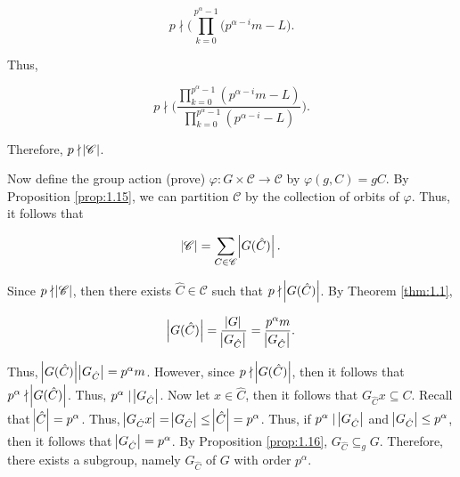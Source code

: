 \documentclass{article}
\makeatletter
\theoremstyle{definition}
\theoremstyle{remark}
\let\oldproofname=\proofname
\renewcommand{\proofname}{\bf{\textit{\oldproofname}}}
\theoremstyle{definition}
\renewenvironment{proof}[1][\proofname]{\par
  \pushQED{\qed}%
  \normalfont \topsep6\p@\@plus6\p@\relax
  \list{}{\leftmargin=0mm
          \rightmargin=0mm
          \settowidth{\itemindent}{\itshape#1}%
          \labelwidth=4mm
          \parsep=0pt \listparindent=0mm%
  }
  \item[\hskip\labelsep
        \itshape
    #1\@addpunct{.}]\ignorespaces
}{%
  \popQED\endlist\@endpefalse
}
\makeatother
\begin{document}
\begin{proof}
            \begin{equation*}
                p\nmid\bigg(\prod\limits_{k=0}^{p^{\alpha}-1}(p^{\alpha-i}m-L\bigg).
            \end{equation*}
                
            Thus, 
                
            \begin{equation*}
                p\nmid\bigg(\frac{\prod\limits_{k=0}^{p^{\alpha}-1}(p^{\alpha-i}m-L)}{\prod\limits_{k=0}^{p^{\alpha}-1}(p^{\alpha-i}-L)}\bigg).
            \end{equation*}
                
            Therefore, $p\nmid\abs{\mathscr{C}}$.\par\hspace{4mm} Now define the group action (prove) $\varphi\colon G\times\mathscr{C}\rightarrow\mathscr{C}$ by $\varphi(g,C)=gC$. By Proposition \ref{prop:1.15}, we can partition $\mathscr{C}$ by the collection of orbits of $\varphi$. Thus, it follows that
                
            \begin{equation*}
                \abs{\mathscr{C}}=\sum_{C\in\mathscr{C}}\abs{G(\hat{C})}.
            \end{equation*}
                
            Since $p\nmid\abs{\mathscr{C}}$, then there exists $\hat{C}\in\mathscr{C}$ such that $p\nmid\abs{G(\hat{C})}$. By Theorem \ref{thm:1.1}, 
            
            \begin{equation*}
                \abs{G(\hat{C})}=\frac{\abs{G}}{\abs{G_{\hat{C}}}}=\frac{p^{\alpha}m}{\abs{G_{\hat{C}}}}.
            \end{equation*}
            
            Thus, $\abs{G(\hat{C})}\abs{G_{\hat{C}}}=p^{\alpha}m$. However, since $p\nmid\abs{G(\hat{C})}$, then it follows that $p^{\alpha}\nmid\abs{G(\hat{C})}$. Thus, $p^{\alpha}\mid\abs{G_{\hat{C}}}$. Now let $x\in\hat{C}$, then it follows that $G_{\hat{C}}x\subseteq C$. Recall that $\abs{\hat{C}}=p^{\alpha}$. Thus, $\abs{G_{\hat{C}}x}=\abs{G_{\hat{C}}}\leq\abs{\hat{C}}=p^{\alpha}$. Thus, if $p^{\alpha}\mid\abs{G_{\hat{C}}}$ and $\abs{G_{\hat{C}}}\leq p^{\alpha}$, then it follows that $\abs{G_{\hat{C}}}=p^{\alpha}$. By Proposition \ref{prop:1.16}, $G_{\hat{C}}\subseteq_g G$. Therefore, there exists a subgroup, namely $G_{\hat{C}}$ of $G$ with order $p^{\alpha}$.    
        \end{proof}
        
\end{document}
